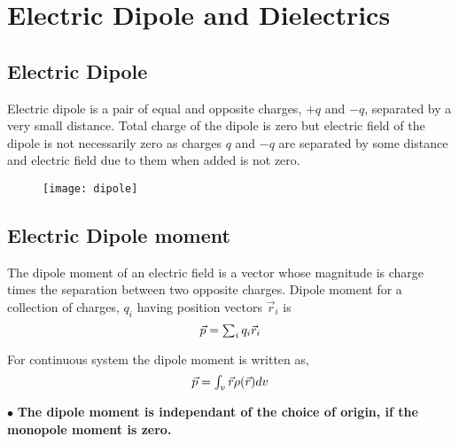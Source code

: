 \chapter{Electric Dipole  and Dielectrics}

\section{Electric Dipole}
\begin{definition}
Electric dipole is a pair of equal and opposite charges, $+q$ and $-q$, separated by a very small distance. Total charge of the dipole is zero but electric field of the dipole is not necessarily zero as charges $q$ and $-q$ are
separated by some distance and electric field due to them when added is not zero.
\begin{figure}[H]
	\begin{center}
		\texttt{[image: dipole]}
	\end{center}
\end{figure}
\end{definition}
\section{Electric Dipole moment}
 The dipole moment of an electric field is a vector whose magnitude is charge times the separation between two opposite charges.
Dipole moment for a collection of charges, $q_{i}$ having position vectors $\vec{r}_{i}$ is
\begin{equation}
$$
\vec{p}=\sum_{i} q_{i} \vec{r}_{i}
$$
\end{equation}

For continuous system the dipole moment is written as,
\begin{equation}
$$
\vec{p}=\int_{v} \vec{r} \rho(\vec{r}) d v
$$
\end{equation}

	$ \bullet $ \textbf{The dipole moment is independant of the choice of origin, if the monopole moment is zero.}


